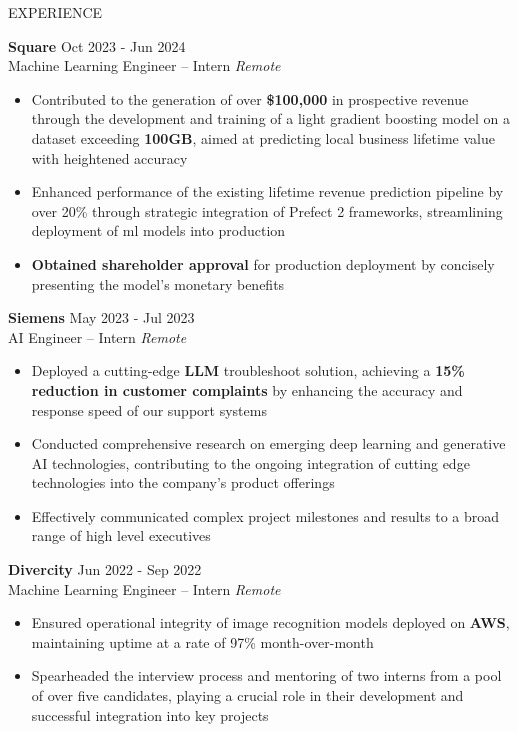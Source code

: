\documentclass{resume} %
\begin{document}
\begin{rSection}{EXPERIENCE}

    \textbf{Square} \hfill Oct 2023 - Jun 2024\\
    Machine Learning Engineer -- Intern \hfill \textit{Remote}
     \begin{itemize}
        \itemsep -3pt {} 
        \item Contributed to the generation of over \textbf{\$100,000} in prospective revenue through the development and training of a light gradient boosting model on a dataset exceeding \textbf{100GB}, aimed at predicting local business lifetime value with heightened accuracy
        \item Enhanced performance of the existing lifetime revenue prediction pipeline by over 20\% through strategic integration of Prefect 2 frameworks, streamlining deployment of ml models into production
        \item \textbf{Obtained shareholder approval} for production deployment by concisely presenting the model's monetary benefits
     \end{itemize}
     
    \textbf{Siemens} \hfill May 2023 - Jul 2023\\
    AI Engineer -- Intern \hfill \textit{Remote}
     \begin{itemize}
        \itemsep -3pt {} 
        \item Deployed a cutting-edge \textbf{LLM} troubleshoot solution, achieving a \textbf{15\% reduction in customer complaints} by enhancing the accuracy and response speed of our support systems
        \item Conducted comprehensive research on emerging deep learning and generative AI technologies, contributing to the ongoing integration of cutting edge technologies into the company's product offerings
        \item Effectively communicated complex project milestones and results to a broad range of high level executives
     \end{itemize}
    
    \textbf{Divercity} \hfill Jun 2022 - Sep 2022\\
    Machine Learning Engineer -- Intern \hfill \textit{Remote}
     \begin{itemize}
        \itemsep -3pt {} 
        \item Ensured operational integrity of image recognition models deployed on \textbf{AWS}, maintaining uptime at a rate of 97\% month-over-month
        \item Spearheaded the interview process and mentoring of two interns from a pool of over five candidates, playing a crucial role in their development and successful integration into key projects
     \end{itemize}
    
    \end{rSection}
    
\end{document}
